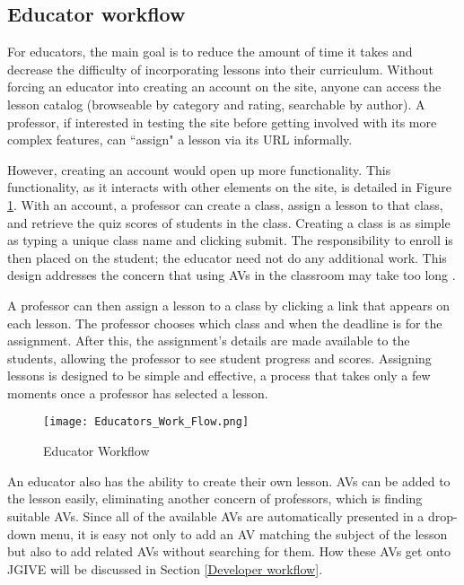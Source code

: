 \documentclass{acm_proc_article-sp}
\begin{document}
\subsection{Educator workflow}
For educators, the main goal is to reduce the amount of time it takes and decrease the difficulty of incorporating lessons into their curriculum. Without forcing an educator into creating an account on the site, anyone can access the lesson catalog (browseable by category and rating, searchable by author). A professor, if interested in testing the site before getting involved with its more complex features, can ``assign" a lesson via its URL informally.

However, creating an account would open up more functionality. This functionality, as it interacts with other elements on the site, is detailed in Figure \ref{fig:Educators Work Flow}. With an account, a professor can create a class, assign a lesson to that class, and retrieve the quiz scores of students in the class. Creating a class is as simple as typing a unique class name and clicking submit. The responsibility to enroll is then placed on the student; the educator need not do any additional work. This design addresses the concern that using AVs in the classroom may take too long \cite{ineducation}.

A professor can then assign a lesson to a class by clicking a link that appears on each lesson. The professor chooses which class and when the deadline is for the assignment. After this, the assignment's details are made available to the students, allowing the professor to see student progress and scores. Assigning lessons is designed to be simple and effective, a process that takes only a few moments once a professor has selected a lesson.

\begin{figure}[h]
  \begin{center}
    \texttt{[image: Educators\_Work\_Flow.png]}
  \end{center}
  \caption{Educator Workflow}
  \label{fig:Educators Work Flow}
\end{figure}

An educator also has the ability to create their own lesson. AVs can be added to the lesson easily, eliminating another concern of professors, which is finding suitable AVs. \cite{ineducation,avwiki} Since all of the available AVs are automatically presented in a drop-down menu, it is easy not only to add an AV matching the subject of the lesson but also to add related AVs without searching for them. How these AVs get onto JGIVE will be discussed in Section \ref{Developer workflow}.
\end{document}
